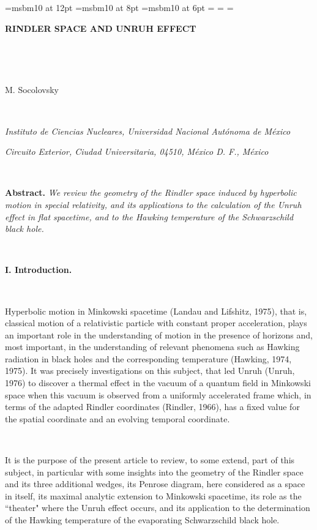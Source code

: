 



\newfam\msbfam
\font\twlmsb=msbm10 at 12pt
\font\eightmsb=msbm10 at 8pt
\font\sixmsb=msbm10 at 6pt
\textfont\msbfam=\twlmsb
\scriptfont\msbfam=\eightmsb
\scriptscriptfont\msbfam=\sixmsb
\def\cj{\fam\msbfam}
\def\A{{\cj A}}
\def\B{{\cj B}}
\def\C{{\cj C}}  
\def\D{{\cj D}}
\def\E{{\cj E}}
\def\G{{\cj G}}
\def\h{{\cj H}}
\def\N{{\cj N}}
\def\Oh{{\cj O}}
\def\p{{\cj P}}
\def\Q{{\cj Q}}
\def\R{{\cj R}}
\def\s{{\cj S}}
\def\Z{{\cj Z}}
\def\I{{\cj I}}

\centerline{\bf RINDLER SPACE AND UNRUH EFFECT} 

\

\

\centerline{M. Socolovsky}

\

\centerline{\it  Instituto de Ciencias Nucleares, Universidad Nacional Aut\'onoma de M\'exico}
\centerline{\it Circuito Exterior, Ciudad Universitaria, 04510, M\'exico D. F., M\'exico} 

\

{\bf Abstract.} {\it We review the geometry of the Rindler space induced by hyperbolic motion in special relativity, and its applications to the calculation of the Unruh effect in flat spacetime, and to the Hawking temperature of the Schwarzschild black hole.}

\

{\bf I. Introduction.}

\

Hyperbolic motion in Minkowski spacetime (Landau and Lifshitz, 1975), that is, classical motion of a relativistic particle with constant proper acceleration, plays an important role in the understanding of motion in the presence of horizons and, most important, in the understanding of relevant phenomena such as Hawking radiation in black holes and the corresponding temperature (Hawking, 1974, 1975). It was precisely investigations on this subject, that led Unruh (Unruh, 1976) to discover a thermal effect in the vacuum of a quantum field in Minkowski space when this vacuum is observed from a uniformly accelerated frame which, in terms of the adapted Rindler coordinates (Rindler, 1966), has a fixed value for the spatial coordinate and an evolving temporal coordinate. 

\

It is the purpose of the present article to review, to some extend, part of this subject, in particular with some insights into the geometry of the Rindler space and its three additional wedges, its Penrose diagram, here considered as a space in itself, its maximal analytic extension to Minkowski spacetime, its role as the ``theater" where the Unruh effect occurs, and its application to the determination of the Hawking temperature of the evaporating Schwarzschild black hole.

